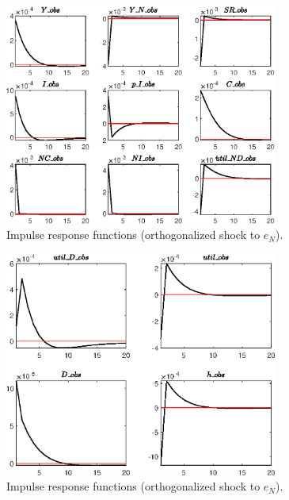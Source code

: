 \begin{figure}[H]
\centering 
\includegraphics[width=0.80\textwidth]{BRS_sectoral/graphs/BRS_sectoral_IRF_e_N1}
\caption{Impulse response functions (orthogonalized shock to ${e_N}$).}\label{Fig:IRF:e_N:1}
\end{figure}
 
\begin{figure}[H]
\centering 
\includegraphics[width=0.80\textwidth]{BRS_sectoral/graphs/BRS_sectoral_IRF_e_N2}
\caption{Impulse response functions (orthogonalized shock to ${e_N}$).}\label{Fig:IRF:e_N:2}
\end{figure}
 
